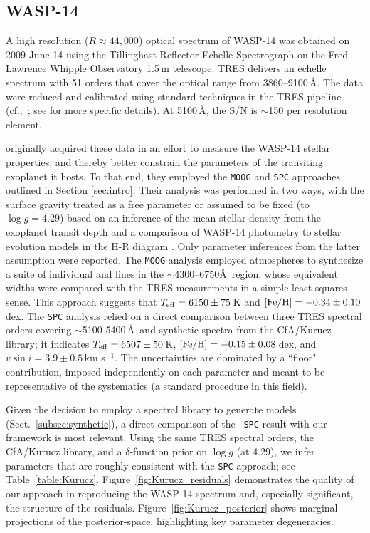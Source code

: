 \documentclass[iop,floatfix,numberedappendix,twocolappendix]{emulateapj}
\begin{document}
\subsection{WASP-14} \label{subsec:wasp}

A high resolution ($R\approx44,000$) optical spectrum of WASP-14 was obtained on 2009 June 14 
using the Tillinghast Reflector Echelle Spectrograph \citep[TRES;][]{furesz08} on the Fred Lawrence 
Whipple Observatory 1.5\,m telescope.  TRES delivers an echelle spectrum with 51 orders that cover 
the optical range from 3860--9100\,\AA.  The data were reduced and calibrated using standard 
techniques in the TRES pipeline (cf.,~\citealt{buchhave10}; see \citealt{torres12} for more 
specific details).  At 5100\,\AA, the S/N is $\sim$150 per resolution element.  

\citet{torres12} originally acquired these data in an effort to measure the WASP-14 stellar 
properties, and thereby better constrain the parameters of the transiting exoplanet it hosts.  To 
that end, they employed the {\tt MOOG} and {\tt SPC} approaches outlined in Section 
\ref{sec:intro}.  Their analysis was performed in two ways, with the surface gravity treated as a 
free parameter or assumed to be fixed (to $\log g = 4.29$) based on an inference of the mean 
stellar density from the exoplanet transit depth and a comparison of WASP-14 photometry to stellar 
evolution models in the H-R diagram \citep{joshi09}.  Only parameter inferences from the latter 
assumption were reported.  The {\tt MOOG} analysis employed \citet{kurucz93} atmospheres to 
synthesize a suite of individual  and  lines in the $\sim$4300--6750\AA\ 
region, whose equivalent widths were compared with the TRES measurements in a simple least-squares 
sense.  This approach suggests that $T_{\rm eff} = 6150\pm75$\,K and $[{\rm Fe/H}] = 
-0.34\pm0.10$\,dex.  The {\tt SPC} analysis relied on a direct comparison between three TRES 
spectral orders covering $\sim$5100-5400\,\AA\ and synthetic spectra from the {\sc CfA/Kurucz} 
library; it indicates $T_{\rm eff} = 6507\pm50$\,K, $[{\rm Fe/H}] = -0.15\pm0.08$\,dex, and $v \sin 
i = 3.9\pm0.5$\,km s$^{-1}$.  The uncertainties are dominated by a ``floor" contribution, imposed 
independently on each parameter and meant to be representative of the systematics (a standard 
procedure in this field).  

Given the decision to employ a spectral library to generate models (Sect.~\ref{subsec:synthetic}), 
a direct comparison of the \citeauthor{torres12}~{\tt SPC} result with our framework is most 
relevant.  Using the same TRES spectral orders, the {\sc CfA/Kurucz} library, and a 
$\delta$-function prior on $\log g$ (at 4.29), we infer parameters that are roughly consistent with 
the {\tt SPC} approach; see Table~\ref{table:Kurucz}.  Figure~\ref{fig:Kurucz_residuals} 
demonstrates the quality of our approach in reproducing the WASP-14 spectrum and, especially 
significant, the structure of the residuals.  Figure~\ref{fig:Kurucz_posterior} shows marginal 
projections of the posterior-space, highlighting key parameter degeneracies.  
\end{document}
